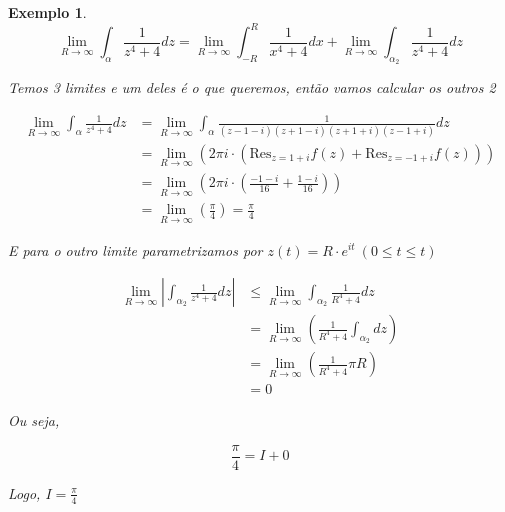 \documentclass{article}
\newtheorem{ex}{Exemplo}
\begin{document}
\begin{ex}
\begin{equation*}
    \lim_{R \to \infty} \int_\alpha \frac{1}{z^4 + 4} d z = \lim_{R \to \infty} \int_{-R}^R \frac{1}{x^4 + 4} d x + \lim_{R \to \infty} \int_{\alpha_2} \frac{1}{z^4 + 4} d z
\end{equation*}

Temos 3 limites e um deles é o que queremos, então vamos calcular os outros 2

\begin{align*}
    \lim_{R \to \infty} \int_\alpha \frac{1}{z^4 + 4} d z &= \lim_{R \to \infty} \int_\alpha \frac{1}{(z - 1 -i)(z +1 - i)(z + 1 + i)(z - 1 + i)}d z \\
    &= \lim_{R \to \infty} \left( 2 \pi i \cdot \left( \mathrm{Res}_{z = 1 + i} f(z) + \mathrm{Res}_{z = - 1 + i} f(z) \right) \right) \\
    &= \lim_{R \to \infty} \left( 2 \pi i \cdot \left( \frac{- 1 - i}{16} + \frac{1 - i}{16} \right) \right) \\
    &= \lim_{R \to \infty} \left( \frac{\pi}{4} \right) = \frac{\pi}{4}
\end{align*}

E para o outro limite parametrizamos por $z(t) = R \cdot e^{i t}\ (0 \leq t \leq t)$

\begin{align*}
    \lim_{R \to \infty} \left| \int_{\alpha_2} \frac{1}{z^4 + 4}d z \right| &\leq \lim_{R \to \infty} \int_{\alpha_2} \frac{1}{R^4 + 4}d z \\
    &= \lim_{R \to \infty} \left( \frac{1}{R^4 + 4} \int_{\alpha_2} d z \right) \\
    &= \lim_{R \to \infty} \left( \frac{1}{R^4 + 4} \pi R \right) \\
    &= 0
\end{align*}

Ou seja,

$$\frac{\pi}{4} = I + 0$$

Logo, $I = \frac{\pi}{4}$
\end{ex}
\end{document}
